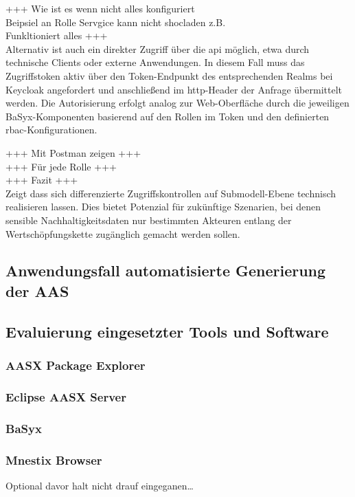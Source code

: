 +++ Wie ist es wenn nicht alles konfiguriert \\
Beipsiel an Rolle Servgice kann nicht shocladen z.B.\\
 Funkltioniert alles +++\\

Alternativ ist auch ein direkter Zugriff über die \acs{api} möglich, etwa durch technische Clients oder externe Anwendungen.  
In diesem Fall muss das Zugriffstoken aktiv über den Token-Endpunkt des entsprechenden Realms bei Keycloak angefordert und anschließend im \acs{http}-Header der Anfrage übermittelt werden.  
Die Autorisierung erfolgt analog zur Web-Oberfläche durch die jeweiligen BaSyx-Komponenten basierend auf den Rollen im Token und den definierten \acs{rbac}-Konfigurationen.

+++ Mit Postman zeigen +++\\
+++ Für jede Rolle +++\\

+++ Fazit +++ \\

Zeigt dass sich differenzierte Zugriffskontrollen auf Submodell-Ebene technisch realisieren lassen. 
Dies bietet Potenzial für zukünftige Szenarien, bei denen sensible Nachhaltigkeitsdaten nur bestimmten Akteuren entlang der Wertschöpfungskette zugänglich gemacht werden sollen.

\subsection{Anwendungsfall automatisierte Generierung der AAS}

\subsection{Evaluierung eingesetzter Tools und Software}
\subsubsection{AASX Package Explorer}
\subsubsection{Eclipse AASX Server}
\subsubsection{BaSyx}
\subsubsection{Mnestix Browser}
Optional davor halt nicht drauf eingeganen\dots
